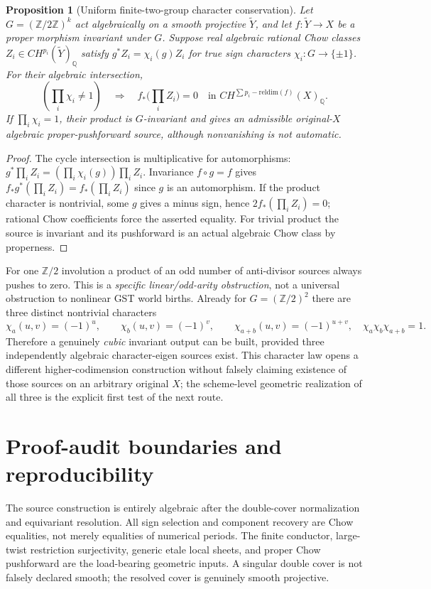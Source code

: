 \documentclass[11pt]{article}
\newtheorem{proposition}{Proposition}
\begin{document}
\begin{proposition}[Uniform finite-two-group character conservation]
Let $G=(\mathbb Z/2\mathbb Z)^k$ act algebraically on a
smooth projective $\widetilde Y$, and let
$f:\widetilde Y\to X$ be a proper morphism invariant
under $G$. Suppose real algebraic rational Chow
classes $Z_i\in CH^{p_i}(\widetilde Y)_{\mathbb Q}$
satisfy $g^*Z_i=\chi_i(g)Z_i$ for true sign
characters $\chi_i:G\to\{\pm1\}$.
For their algebraic intersection,
\[
  \boxed{
  \left(\prod_i\chi_i\ne1\right)\quad\Longrightarrow\quad
  f_*\bigl(\prod_i Z_i\bigr)=0
  \quad\text{in }CH^{\sum p_i-\mathrm{reldim}(f)}(X)_{\mathbb Q}.
  } \tag{9}
\]
If $\prod_i\chi_i=1$, their product is $G$-invariant
and gives an admissible original-$X$ algebraic
proper-pushforward source, although nonvanishing is
not automatic.
\end{proposition}
\begin{proof}
The cycle intersection is multiplicative for automorphisms:
$g^*\prod_iZ_i=(\prod_i\chi_i(g))\prod_iZ_i$.
Invariance $f\circ g=f$ gives
$f_*g^*(\prod_iZ_i)=f_*(\prod_iZ_i)$
since $g$ is an automorphism. If the product character
is nontrivial, some $g$ gives a minus sign, hence
$2 f_*(\prod_iZ_i)=0$; rational Chow coefficients
force the asserted equality. For trivial product
the source is invariant and its pushforward is
an actual algebraic Chow class by properness.
\end{proof}

For one $\mathbb Z/2$ involution a product of an odd
number of anti-divisor sources always pushes to zero.
This is a \emph{specific linear/odd-arity obstruction},
not a universal obstruction to nonlinear GST world
births. Already for $G=(\mathbb Z/2)^2$ there
are three distinct nontrivial characters
\[
 \chi_a(u,v)=(-1)^u,\qquad
 \chi_b(u,v)=(-1)^v,\qquad
 \chi_{a+b}(u,v)=(-1)^{u+v},
 \quad \chi_a\chi_b\chi_{a+b}=1 .                 \tag{10}
\]
Therefore a genuinely \emph{cubic} invariant output can
be built, provided three independently algebraic
character-eigen sources exist. This character law
opens a different higher-codimension construction
without falsely claiming existence of those sources
on an arbitrary original $X$; the scheme-level
geometric realization of all three is the explicit
first test of the next route.

\section{Proof-audit boundaries and reproducibility}
The source construction is entirely algebraic after the
double-cover normalization and equivariant resolution.
All sign selection and component recovery are Chow
equalities, not merely equalities of numerical periods.
The finite conductor, large-twist restriction surjectivity,
generic etale local sheets, and proper Chow pushforward
are the load-bearing geometric inputs. A singular
double cover is not falsely declared smooth; the
resolved cover is genuinely smooth projective.
\end{document}
